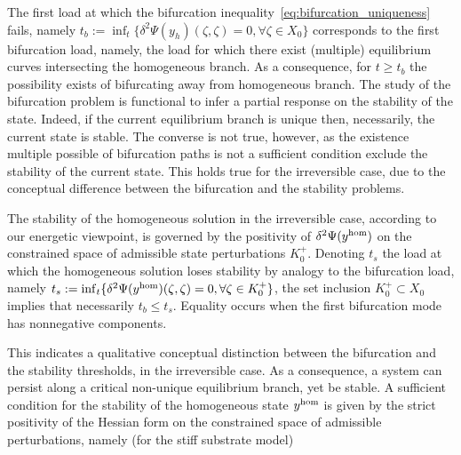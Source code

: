 \documentclass[10pt]{article}
\begin{document}
The first load at which the bifurcation inequality~\eqref{eq:bifurcation_uniqueness} fails, namely $t_b:=\inf_t \{\delta^2 \Psi(y_h)(\zeta, \zeta) =0, \forall \zeta \in X_0 \}$ corresponds to the first  bifurcation load, namely, the load for which there exist (multiple) equilibrium curves intersecting the homogeneous branch. As a consequence, for $t\geq t_b$  the possibility exists of bifurcating away from homogeneous branch. The study of the bifurcation problem is functional to infer a partial response on the stability of the state. Indeed, if the current equilibrium branch is unique then, necessarily, the current state is stable. The converse is not true, however, as the existence multiple possible of bifurcation paths is not a sufficient condition exclude the stability of the current state. This holds true for the irreversible case, due to the conceptual difference between the bifurcation and the stability problems.

The stability of the homogeneous solution in the irreversible case, according to our energetic viewpoint, is governed by the positivity of $\delta^2 \Psi(y^{\text{hom}})$ on the constrained space of admissible state perturbations $K^+_0$.
%
Denoting $t_s$ the load at which the homogeneous solution loses stability by analogy to the bifurcation load, namely $t_s: = \inf_t \{\delta^2 \Psi(y^{\text{hom}})(\zeta, \zeta) =0, \forall \zeta \in K^+_0 \}$, the set inclusion $K^+_0 \subset X_0$ implies that necessarily $t_b \leq t_s$. Equality occurs when the first bifurcation mode has nonnegative components.

This indicates a qualitative conceptual distinction between the bifurcation and the stability thresholds, in the irreversible case. As a consequence, a system can persist along a critical non-unique equilibrium branch, yet be stable.
A sufficient condition for the stability of the homogeneous state $y^{\text{hom}}$ is given by the strict positivity  of the Hessian form on the constrained space of admissible perturbations, namely (for the stiff substrate model)
\end{document}
